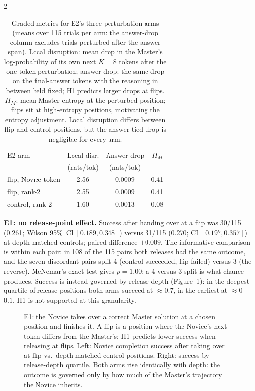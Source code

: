 \documentclass[9pt]{article}
\newcommand{\inputpgf}[1]{%
  \begingroup
  \def\mathdefault##1{##1}%
  \everymath=\expandafter{\the\everymath\displaystyle}%
  \fontsize{8}{9.6}\selectfont
  \endgroup
}
\begin{document}
\begin{multicols}{2}
\begin{table}[H]
  \small
  \centering
  \caption{Graded metrics for E2's three perturbation arms (means over 115
    trials per arm; the answer-drop column excludes trials perturbed after
    the answer span). Local disruption: mean drop in the Master's
    log-probability of its own next $K{=}8$ tokens after the one-token
    perturbation; answer drop: the same drop on the final-answer tokens with
    the reasoning in between held fixed; H1 predicts larger drops at flips.
    $H_M$: mean Master entropy at the perturbed position; flips sit at
    high-entropy positions, motivating the entropy adjustment. Local
    disruption differs between flip and control positions, but the
    answer-tied drop is negligible for every arm.}
  \label{tab:graded}
  \begin{tabular}{lccc}
    \toprule
    E2 arm & Local disr. & Answer drop & $H_M$ \\
           & (nats/tok)  & (nats/tok)  &       \\
    \midrule
    flip, Novice token & 2.56 & 0.0009 & 0.41 \\
    flip, rank-2       & 2.55 & 0.0009 & 0.41 \\
    control, rank-2    & 1.60 & 0.0013 & 0.08 \\
    \bottomrule
  \end{tabular}
\end{table}

\textbf{E1: no release-point effect.} Success after handing over at a flip was
30/115 (0.261; Wilson 95\%~CI $[0.189, 0.348]$) versus 31/115 (0.270; CI
$[0.197, 0.357]$) at depth-matched controls; paired difference
$+0.009$. The informative comparison is within each pair: in 108 of the 115
pairs both releases had the same outcome, and the seven discordant pairs split
4 (control succeeded, flip failed) versus 3 (the reverse). McNemar's exact
test gives $p = 1.00$: a 4-versus-3 split is what chance produces. Success is
instead governed by release depth
(Figure~\ref{fig:release}): in the deepest quartile of release positions both
arms succeed at $\approx 0.7$, in the earliest at $\approx 0$--$0.1$. H1 is
not supported at this granularity.

\begin{figure}[H]
  \centering
  \resizebox{0.4\textwidth}{!}{\inputpgf{figures/e1_release_depth.pgf}}
  \caption{E1: the Novice takes over a correct Master
    solution at a chosen position and finishes it. A flip is a position where
    the Novice's next token differs from the Master's; H1 predicts
    lower success when releasing at flips. Left: Novice completion success
    after taking over at flip vs.\ depth-matched control positions. Right: success by release-depth quartile. Both arms rise identically with depth: the
    outcome is governed only by how much of the Master's trajectory the Novice
    inherits.}
  \label{fig:release}
\end{figure}


\end{multicols}
\end{document}
